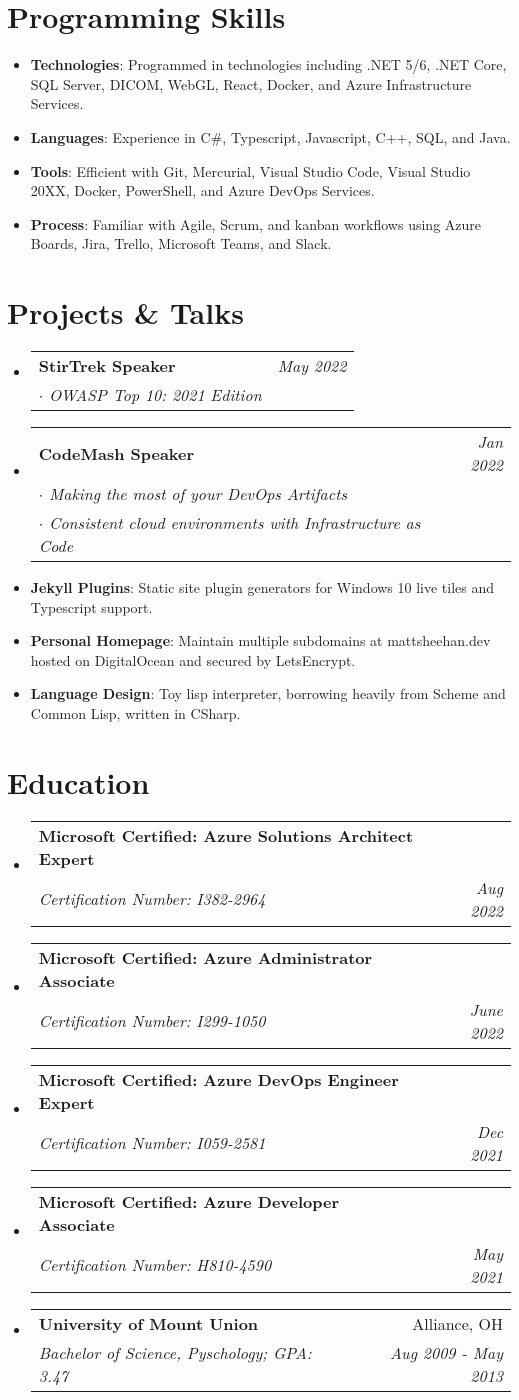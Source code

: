 \documentclass[letterpaper,11pt]{article}
\makeatletter
\newcommand{\resumeItem}[2]{
  \item\small{
    \textbf{#1}{: #2 \vspace{-2pt}}
  }
}
\newcommand{\resumeSubheading}[4]{
  \vspace{-1pt}\item
    \begin{tabular*}{0.97\textwidth}[t]{l@{\extracolsep{\fill}}r}
      \textbf{#1} & #2 \\
      \textit{\small#3} & \textit{\small #4} \\
    \end{tabular*}\vspace{-5pt}
}
\newcommand{\resumeSubheadingMultiline}[5]{
  \vspace{-1pt}\item
    \begin{tabular*}{0.97\textwidth}[t]{l@{\extracolsep{\fill}}r}
      \textbf{#1} & #2 \\
      \textit{\small#3} & \textit{\small #4} \\
      \textit{\small#5} \\
    \end{tabular*}\vspace{-6pt}
}
\newcommand{\resumeSubItem}[2]{\resumeItem{#1}{#2}\vspace{-4pt}}
\newcommand{\resumeSubHeadingListStart}{\begin{itemize}[leftmargin=*]}
\newcommand{\resumeSubHeadingListEnd}{\end{itemize}}
\makeatother
\begin{document}
\section{Programming Skills}
    \resumeSubHeadingListStart
        \resumeSubItem{Technologies}
          {Programmed in technologies including .NET 5/6, .NET Core, SQL Server, DICOM, WebGL, React, Docker, and Azure Infrastructure Services.}
        \resumeSubItem{Languages}
          {Experience in C\#, Typescript, Javascript, C++, SQL, and Java.}
        \resumeSubItem{Tools}
          {Efficient with Git, Mercurial, Visual Studio Code, Visual Studio 20XX, Docker, PowerShell, and Azure DevOps Services.}
        \resumeSubItem{Process}
          {Familiar with Agile, Scrum, and kanban workflows using Azure Boards, Jira, Trello, Microsoft Teams, and Slack. }
    \resumeSubHeadingListEnd


\section{Projects \& Talks}
  \resumeSubHeadingListStart
    \resumeSubheading
      {StirTrek Speaker}{\textit{\small May 2022}}
      {$\cdot$ OWASP Top 10: 2021 Edition}{}\vspace{-4pt}
    \resumeSubheadingMultiline
      {CodeMash Speaker}{\textit{\small Jan 2022}}
      {$\cdot$ Making the most of your DevOps Artifacts}{}
      {$\cdot$ Consistent cloud environments with Infrastructure as Code}
    \resumeSubItem{Jekyll Plugins}
      {Static site plugin generators for Windows 10 live tiles and Typescript support.}
    \resumeSubItem{Personal Homepage}
      {Maintain multiple subdomains at mattsheehan.dev hosted on DigitalOcean and secured by LetsEncrypt.}
    \resumeSubItem{Language Design}
      {Toy lisp interpreter, borrowing heavily from Scheme and Common Lisp, written in CSharp.}
  \resumeSubHeadingListEnd


\section{Education}
  \resumeSubHeadingListStart
    \resumeSubheading
      {Microsoft Certified: Azure Solutions Architect Expert}{}
      {Certification Number: I382-2964}{Aug 2022}
    \resumeSubheading
      {Microsoft Certified: Azure Administrator Associate}{}
      {Certification Number: I299-1050}{June 2022}
    \resumeSubheading
      {Microsoft Certified: Azure DevOps Engineer Expert}{}
      {Certification Number: I059-2581}{Dec 2021}
    \resumeSubheading
      {Microsoft Certified: Azure Developer Associate}{}
      {Certification Number: H810-4590}{May 2021}
    \resumeSubheading
      {University of Mount Union}{Alliance, OH}
      {Bachelor of Science, Pyschology;  GPA: 3.47}{Aug 2009 - May 2013}
  \resumeSubHeadingListEnd
\end{document}
